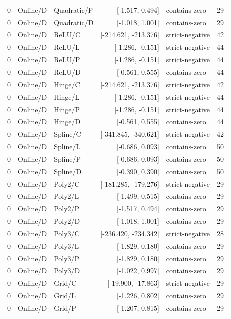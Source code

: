 \begin{longtable}{lllrlr}
0 & Online/D & Quadratic/P & [-1.517, 0.494] & contains-zero & 29 \\
0 & Online/D & Quadratic/D & [-1.018, 1.001] & contains-zero & 29 \\
0 & Online/D & ReLU/C & [-214.621, -213.376] & strict-negative & 42 \\
0 & Online/D & ReLU/L & [-1.286, -0.151] & strict-negative & 44 \\
0 & Online/D & ReLU/P & [-1.286, -0.151] & strict-negative & 44 \\
0 & Online/D & ReLU/D & [-0.561, 0.555] & contains-zero & 44 \\
0 & Online/D & Hinge/C & [-214.621, -213.376] & strict-negative & 42 \\
0 & Online/D & Hinge/L & [-1.286, -0.151] & strict-negative & 44 \\
0 & Online/D & Hinge/P & [-1.286, -0.151] & strict-negative & 44 \\
0 & Online/D & Hinge/D & [-0.561, 0.555] & contains-zero & 44 \\
0 & Online/D & Spline/C & [-341.845, -340.621] & strict-negative & 42 \\
0 & Online/D & Spline/L & [-0.686, 0.093] & contains-zero & 50 \\
0 & Online/D & Spline/P & [-0.686, 0.093] & contains-zero & 50 \\
0 & Online/D & Spline/D & [-0.390, 0.390] & contains-zero & 50 \\
0 & Online/D & Poly2/C & [-181.285, -179.276] & strict-negative & 29 \\
0 & Online/D & Poly2/L & [-1.499, 0.515] & contains-zero & 29 \\
0 & Online/D & Poly2/P & [-1.517, 0.494] & contains-zero & 29 \\
0 & Online/D & Poly2/D & [-1.018, 1.001] & contains-zero & 29 \\
0 & Online/D & Poly3/C & [-236.420, -234.342] & strict-negative & 28 \\
0 & Online/D & Poly3/L & [-1.829, 0.180] & contains-zero & 29 \\
0 & Online/D & Poly3/P & [-1.829, 0.180] & contains-zero & 29 \\
0 & Online/D & Poly3/D & [-1.022, 0.997] & contains-zero & 29 \\
0 & Online/D & Grid/C & [-19.900, -17.863] & strict-negative & 29 \\
0 & Online/D & Grid/L & [-1.226, 0.802] & contains-zero & 29 \\
0 & Online/D & Grid/P & [-1.207, 0.815] & contains-zero & 29 \\

\end{longtable}

